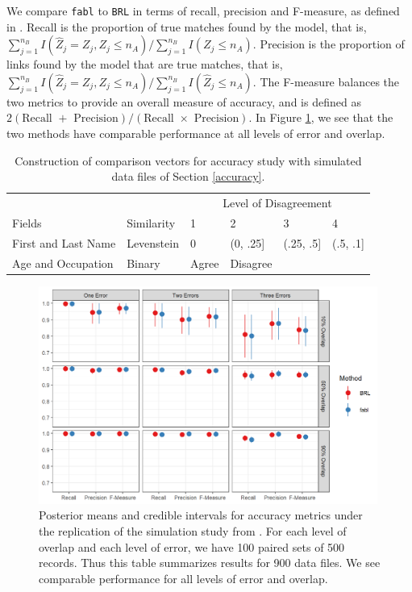 \documentclass[ba]{imsart}
\begin{document}
	
	We compare \texttt{fabl} to \texttt{BRL} in terms of recall, precision and F-measure, as defined in \cite{christen_2012}. Recall is the proportion of true matches found by the model, that is, $\sum_{j=1}^{n_B} I(\hat{Z}_j = Z_j, Z_j \leq n_A) / \sum_{j=1}^{n_B} I(Z_j \leq n_A)$. Precision is the proportion of links found by the model that are true matches, that is, $\sum_{j=1}^{n_B} I(\hat{Z}_j = Z_j, Z_j \leq n_A) / \sum_{j=1}^{n_B} I(\hat{Z}_j \leq n_A)$. The F-measure balances the two metrics to provide an overall measure of accuracy, and is defined as $2  (\text{Recall } + \text{ Precision}) / (\text{Recall } \times \text{ Precision})$. In Figure \ref{fig:sadinle_simulation}, we see that the two methods have comparable performance at all levels of error and overlap. 
	
		\begin{table}
		\centering
		\begin{tabular}{llllll}
			
			\multicolumn{2}{c}{ } & \multicolumn{4}{c}{Level of Disagreement} \\
			\cline{3-6}
			Fields & Similarity & 1 & 2 & 3 & 4\\
			\hline
			First and Last Name & Levenstein & 0 & (0, .25] & (.25, .5] & (.5, .1]\\
			Age and Occupation & Binary & Agree & Disagree &  & \\
			\hline
		\end{tabular}
		\caption{Construction of comparison vectors for accuracy study with simulated data files of Section \ref{accuracy}.}
		\label{Tab:sadinle_simulation_cutoffs}
	\end{table}

	\begin{figure}
		\begin{center}
			\includegraphics[width=0.99\textwidth]{../notes/figures/sadinle_sim_plot3} 
			\caption{Posterior means and credible intervals for accuracy metrics under the replication of the simulation study from \cite{sadinle_bayesian_2017}. For each level of overlap and each level of error, we have 100 paired sets of 500 records. Thus this table summarizes results for 900 data files. We see comparable performance for all levels of error and overlap.}
			\label{fig:sadinle_simulation}
		\end{center}
	\end{figure}
\end{document}
